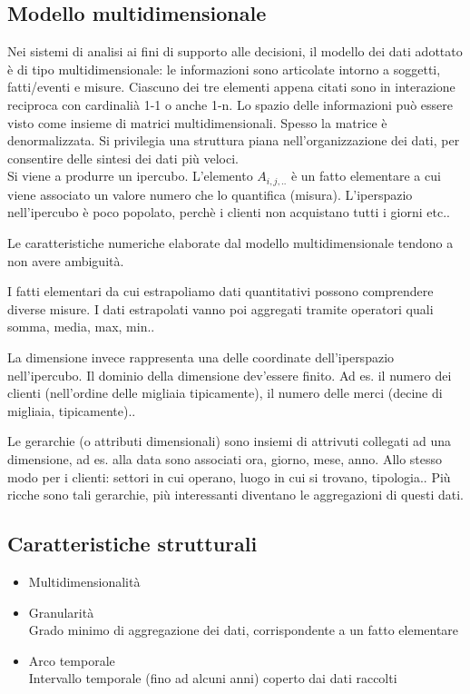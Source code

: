 \subsection{Modello multidimensionale}
\label{sub:Modello multidimensionale}
Nei sistemi di analisi ai fini di supporto alle decisioni, il modello dei dati adottato
\`e di tipo multidimensionale: le informazioni sono articolate intorno a soggetti, fatti/eventi e misure.
Ciascuno dei tre elementi appena citati sono in interazione reciproca con cardinali\`a 1-1 o anche 1-n.
Lo spazio delle informazioni pu\`o essere visto come insieme di matrici multidimensionali.
Spesso la matrice \`e denormalizzata. Si privilegia una struttura piana nell'organizzazione dei dati,
per consentire delle sintesi dei dati pi\`u veloci.\\
Si viene a produrre un ipercubo. L'elemento $A_{i,j,..}$ \`e un fatto elementare a cui viene associato un valore
numero che lo quantifica (misura).
L'iperspazio nell'ipercubo \`e poco popolato, perch\`e i clienti non acquistano tutti i giorni etc..

Le caratteristiche numeriche elaborate dal modello multidimensionale
tendono a non avere ambiguità.

I fatti elementari da cui estrapoliamo dati quantitativi possono
comprendere diverse misure. I dati estrapolati vanno poi aggregati
tramite operatori quali somma, media, max, min..

La dimensione invece rappresenta una delle coordinate dell'iperspazio
nell'ipercubo. Il dominio della dimensione dev'essere finito. Ad es. il
numero dei clienti (nell'ordine delle migliaia tipicamente), il numero
delle merci (decine di migliaia, tipicamente)..

Le gerarchie (o attributi dimensionali) sono insiemi di attrivuti
collegati ad una dimensione, ad es. alla data sono associati ora,
giorno, mese, anno. Allo stesso modo per i clienti: settori in cui
operano, luogo in cui si trovano, tipologia.. Più ricche sono tali
gerarchie, più interessanti diventano le aggregazioni di questi dati.

\subsection{Caratteristiche
strutturali}\label{caratteristiche-strutturali}

\begin{itemize}

\item
  Multidimensionalità
\item
  Granularità\\
  Grado minimo di aggregazione dei dati, corrispondente a un fatto
  elementare
\item
  Arco temporale\\
  Intervallo temporale (fino ad alcuni anni) coperto dai dati raccolti
\end{itemize}


